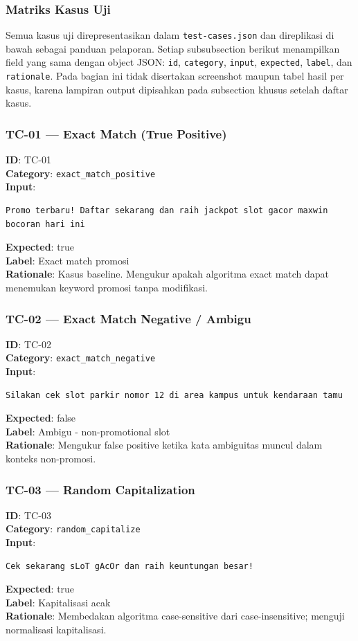 \subsubsection{Matriks Kasus Uji}
Semua kasus uji direpresentasikan dalam \texttt{test-cases.json} dan direplikasi di bawah sebagai panduan pelaporan. Setiap subsubsection berikut menampilkan field yang sama dengan object JSON: \texttt{id}, \texttt{category}, \texttt{input}, \texttt{expected}, \texttt{label}, dan \texttt{rationale}. Pada bagian ini tidak disertakan screenshot maupun tabel hasil per kasus, karena lampiran output dipisahkan pada subsection khusus setelah daftar kasus.

\subsubsection{TC-01 — Exact Match (True Positive)}
\textbf{ID}: TC-01 \\
\textbf{Category}: \texttt{exact\_match\_positive} \\
\textbf{Input}:
\begin{verbatim}Promo terbaru! Daftar sekarang dan raih jackpot slot gacor maxwin bocoran hari ini
\end{verbatim}
\textbf{Expected}: true \\
\textbf{Label}: Exact match promosi \\
\textbf{Rationale}: Kasus baseline. Mengukur apakah algoritma exact match dapat menemukan keyword promosi tanpa modifikasi.

\subsubsection{TC-02 — Exact Match Negative / Ambigu}
\textbf{ID}: TC-02 \\
\textbf{Category}: \texttt{exact\_match\_negative} \\
\textbf{Input}:
\begin{verbatim}Silakan cek slot parkir nomor 12 di area kampus untuk kendaraan tamu
\end{verbatim}
\textbf{Expected}: false \\
\textbf{Label}: Ambigu - non-promotional slot \\
\textbf{Rationale}: Mengukur false positive ketika kata ambiguitas muncul dalam konteks non-promosi.

\subsubsection{TC-03 — Random Capitalization}
\textbf{ID}: TC-03 \\
\textbf{Category}: \texttt{random\_capitalize} \\
\textbf{Input}:
\begin{verbatim}Cek sekarang sLoT gAcOr dan raih keuntungan besar!
\end{verbatim}
\textbf{Expected}: true \\
\textbf{Label}: Kapitalisasi acak \\
\textbf{Rationale}: Membedakan algoritma case-sensitive dari case-insensitive; menguji normalisasi kapitalisasi.

